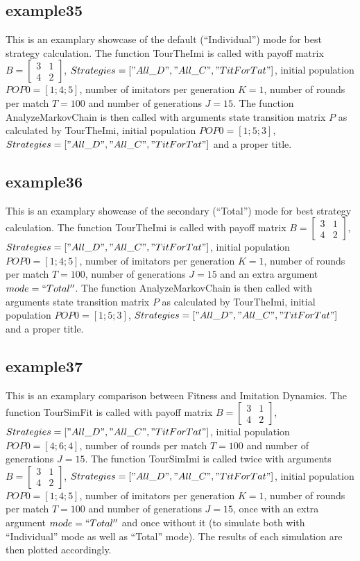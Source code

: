 \subsection{example35}
This is an examplary showcase of the default (``Individual'') mode for best strategy calculation. The function TourTheImi is called with payoff matrix $B = \begin{bmatrix} 3 & 1 \\ 4 & 2 \end{bmatrix}$, $Strategies = ["All\_D", "All\_C", "TitForTat"]$, initial population $POP0 = [1; 4; 5]$, number of imitators per generation $K=1$, number of rounds per match $T = 100$ and number of generations $J = 15$. The function AnalyzeMarkovChain is then called with arguments state transition matrix $P$ as calculated by TourTheImi, initial population $POP0 = [1; 5; 3]$, $Strategies = ["All\_D", "All\_C", "TitForTat"]$ and a proper title.

\subsection{example36}
This is an examplary showcase of the secondary (``Total'') mode for best strategy calculation. The function TourTheImi is called with payoff matrix $B = \begin{bmatrix} 3 & 1 \\ 4 & 2 \end{bmatrix}$, $Strategies = ["All\_D", "All\_C", "TitForTat"]$, initial population $POP0 = [1; 4; 5]$, number of imitators per generation $K=1$, number of rounds per match $T = 100$, number of generations $J = 15$ and an extra argument $mode = ``Total''$. The function AnalyzeMarkovChain is then called with arguments state transition matrix $P$ as calculated by TourTheImi, initial population $POP0 = [1; 5; 3]$, $Strategies = ["All\_D", "All\_C", "TitForTat"]$ and a proper title.

\subsection{example37}
This is an examplary comparison between Fitness and Imitation Dynamics. The function TourSimFit is called with payoff matrix $B = \begin{bmatrix} 3 & 1 \\ 4 & 2 \end{bmatrix}$, $Strategies = ["All\_D", "All\_C", "TitForTat"]$, initial population $POP0 = [4; 6; 4]$, number of rounds per match $T = 100$ and number of generations $J = 15$. The function TourSimImi is called twice with arguments $B = \begin{bmatrix} 3 & 1 \\ 4 & 2 \end{bmatrix}$, $Strategies = ["All\_D", "All\_C", "TitForTat"]$, initial population $POP0 = [1; 4; 5]$, number of imitators per generation $K=1$, number of rounds per match $T = 100$ and number of generations $J = 15$, once with an extra argument $mode = ``Total''$ and once without it (to simulate both with ``Individual'' mode as well as ``Total'' mode). The results of each simulation are then plotted accordingly.

